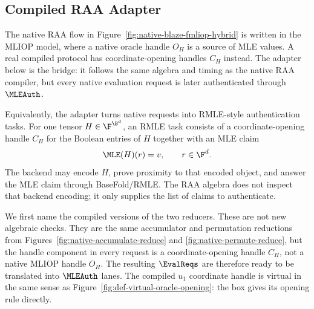 \subsection{Compiled RAA Adapter}

The native RAA flow in Figure~\ref{fig:native-blaze-fmliop-hybrid} is written in the
MLIOP model, where a native oracle handle \(O_H\) is a source of MLE values.  A
real compiled protocol has coordinate-opening handles \(C_H\) instead.  The
adapter below is the bridge: it follows the same algebra and timing as the
native RAA compiler, but every native evaluation request is later authenticated
through \(\MLEAuth\).

Equivalently, the adapter turns native requests into RMLE-style authentication
tasks.  For one tensor \(H\in\F^{\B^d}\), an RMLE task consists of a
coordinate-opening handle \(C_H\) for the Boolean entries of \(H\) together
with an MLE claim
\[
  \MLE(H)(r)=v,\qquad r\in\F^d.
\]
The backend may encode \(H\), prove proximity to that encoded object, and
answer the MLE claim through BaseFold/RMLE.  The RAA algebra does not inspect
that backend encoding; it only supplies the list of claims to authenticate.

We first name the compiled versions of the two reducers.  These are not new
algebraic checks.  They are the same accumulator and permutation reductions
from Figures~\ref{fig:native-accumulate-reduce} and
\ref{fig:native-permute-reduce}, but the handle component in every request is a
coordinate-opening handle \(C_H\), not a native MLIOP handle \(O_H\).  The
resulting \(\EvalReqs\) are therefore ready to be translated into \(\MLEAuth\)
lanes.
The compiled \(u_1\) coordinate handle is virtual in the same sense as
Figure~\ref{fig:def-virtual-oracle-opening}: the box gives its opening rule
directly.

